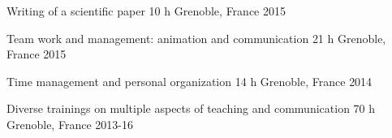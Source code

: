 \begin{cvhonors}

    
  \cvhonor
    {Writing of a scientific paper} %
    {10 h} %
    {Grenoble, France} %
    {2015} %
    {} %

    
  \cvhonor
    {Team work and management: animation and communication} %
    {21 h} %
    {Grenoble, France} %
    {2015} %
    {} %

  \cvhonor
    {Time management and personal organization} %
    {14 h} %
    {Grenoble, France} %
    {2014} %
    {} %
    
  \cvhonor
    {Diverse trainings on multiple aspects of teaching and communication} %
    {70 h} %
    {Grenoble, France} %
    {2013-16} %
	{} %

\end{cvhonors}    
